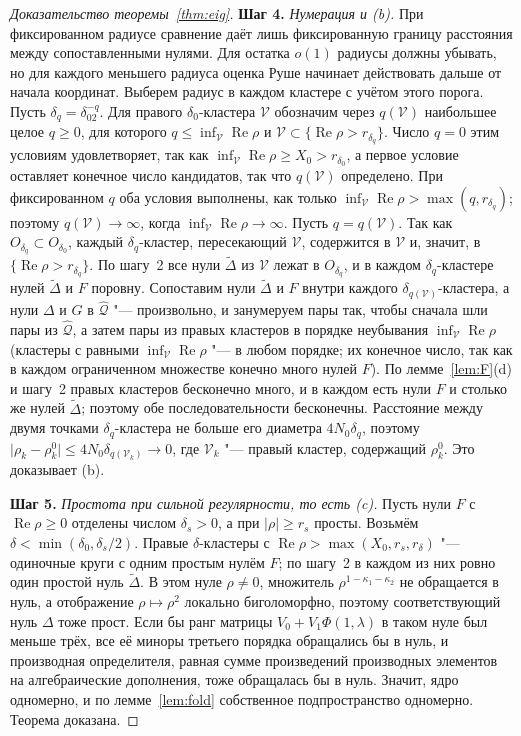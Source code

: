 \documentclass[12pt,a4paper]{article}
\numberwithin{equation}{section}
\theoremstyle{definition}
\newcommand{\step}[1]{\smallskip\noindent\textbf{Шаг #1.}}
\newcommand{\abs}[1]{\lvert#1\rvert}
\newcommand{\Ree}{\operatorname{Re}}
\begin{document}
\begin{proof}[Доказательство теоремы~\ref{thm:eig}]
\step{4} \textit{Нумерация и (b).} При фиксированном радиусе сравнение даёт лишь
фиксированную границу расстояния между сопоставленными нулями. Для остатка $o(1)$
радиусы должны убывать, но для каждого меньшего радиуса оценка Руше начинает
действовать дальше от начала координат. Выберем радиус в каждом кластере с учётом
этого порога. Пусть $\delta_q=\delta_02^{-q}$. Для правого
$\delta_0$-кластера $\mathcal V$ обозначим через $q(\mathcal V)$ наибольшее целое $q\ge0$, для
которого $q\le\inf_{\mathcal V}\Ree\rho$ и $\mathcal V\subset\{\Ree\rho>r_{\delta_q}\}$. Число
$q=0$ этим условиям удовлетворяет, так как
$\inf_{\mathcal V}\Ree\rho\ge X_0>r_{\delta_0}$, а первое условие оставляет конечное число
кандидатов, так что $q(\mathcal V)$ определено. При фиксированном $q$ оба условия выполнены, как
только $\inf_{\mathcal V}\Ree\rho>\max(q,r_{\delta_q})$; поэтому $q(\mathcal V)\to\infty$, когда
$\inf_{\mathcal V}\Ree\rho\to\infty$. Пусть $q=q(\mathcal V)$. Так как $O_{\delta_q}\subset O_{\delta_0}$,
каждый $\delta_q$-кластер, пересекающий $\mathcal V$, содержится в $\mathcal V$ и, значит, в
$\{\Ree\rho>r_{\delta_q}\}$. По шагу~2 все нули $\widetilde\Delta$ из $\mathcal V$ лежат в
$O_{\delta_q}$, и в каждом $\delta_q$-кластере нулей $\widetilde\Delta$ и $F$ поровну. Сопоставим
нули $\widetilde\Delta$ и $F$ внутри каждого $\delta_{q(\mathcal V)}$-кластера, а нули $\Delta$ и $G$
в $\widehat{\mathcal Q}$ "--- произвольно, и занумеруем пары так, чтобы сначала шли пары из
$\widehat{\mathcal Q}$, а затем пары из правых кластеров в порядке неубывания
$\inf_{\mathcal V}\Ree\rho$ (кластеры с равными $\inf_{\mathcal V}\Ree\rho$ "--- в любом порядке;
их конечное число, так как в каждом ограниченном множестве конечно много нулей $F$). По
лемме~\ref{lem:F}(d) и шагу~2 правых кластеров бесконечно много, и
в каждом есть нули $F$ и столько же нулей $\widetilde\Delta$; поэтому обе последовательности
бесконечны. Расстояние между двумя точками $\delta_q$-кластера не больше его диаметра
$4N_0\delta_q$, поэтому $\abs{\rho_k-\rho_k^0}\le4N_0\delta_{q(\mathcal V_k)}\to0$, где
$\mathcal V_k$ "--- правый кластер, содержащий $\rho_k^0$. Это доказывает (b).

\step{5} \textit{Простота при сильной регулярности, то есть (c).} Пусть нули $F$ с
$\Ree\rho\ge0$ отделены числом $\delta_s>0$, а при
$\abs\rho\ge r_s$ просты. Возьмём $\delta<\min(\delta_0,\delta_s/2)$. Правые $\delta$-кластеры с
$\Ree\rho>\max(X_0,r_s,r_\delta)$ "--- одиночные круги с одним простым нулём $F$; по шагу~2 в
каждом из них ровно один простой нуль $\widetilde\Delta$. В этом нуле $\rho\ne0$, множитель
$\rho^{1-\kappa_1-\kappa_2}$ не обращается в нуль, а отображение $\rho\mapsto\rho^2$ локально
биголоморфно, поэтому соответствующий нуль $\Delta$ тоже прост. Если бы ранг
матрицы $V_0+V_1\Phi(1,\lambda)$ в таком нуле был меньше трёх, все её миноры третьего порядка
обращались бы в нуль, и производная определителя, равная сумме произведений производных
элементов на алгебраические дополнения, тоже обращалась бы в нуль. Значит, ядро одномерно, и по
лемме~\ref{lem:fold} собственное подпространство одномерно.
Теорема доказана.
\end{proof}
\end{document}
